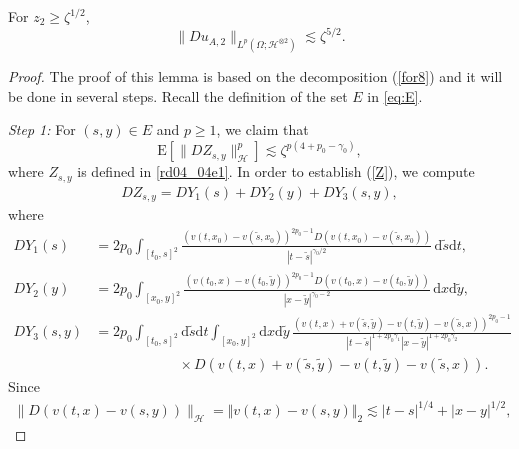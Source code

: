 \documentclass[12pt,a4paper]{article}
\newcommand{\E}{\mathrm{E}}
\renewcommand{\d}{\mathrm{d}}
\newcommand {\deltah}{{\zeta}}
\newcommand{\<}{\langle}
\renewcommand{\>}{\rangle}
\begin{document}
 
 
 \begin{lemma}\label{lem:DuA2}
 For $z_2\geq \deltah^{1/2}$,  
 \begin{equation} \label{UA}
 \|Du_{A,2}\|_{L^p(\Omega;\mathcal{H}^{\otimes2})} \lesssim \deltah^{5/2}.
 \end{equation}
 \end{lemma}
 
 \begin{proof} The proof of this lemma is based on the decomposition (\ref{for8}) and it will be done in several steps. Recall the definition of the set $E$ in \eqref{eq:E}.
 
 \medskip
 \noindent
 {\it Step 1:}
            For $(s,y)\in E$ and $p\geq1$,  we claim that
            \begin{equation} \label{Z}
             \E\left[\|DZ_{s,y}\|_{\mathcal{H}}^p \right] \lesssim \deltah^{p(4+p_0-\gamma_0)},
           \end{equation}
 where $Z_{s,y}$ is defined in \eqref{rd04_04e1}.  In order to establish (\ref{Z}), we compute 
           \begin{align}\label{eq:sum123}
           DZ_{s,y} = DY_1(s) + DY_2(y) + DY_3(s,y),
           \end{align}
           where
\begin{align*}
           DY_1(s) &= 2p_0\int_{[t_0, s]^2} \frac{(v(t,x_0)-v(\tilde{s},x_0))^{2p_0-1} D(v(t,x_0)-v(\tilde{s},x_0))}{|t-\tilde{s}|^{\gamma_0/2}}  \, \d \tilde{s} \d t,\\[6pt]
           DY_2(y)&=2p_0\int_{[x_0, y]^2} \frac {(v(t_0,x)-v(t_0,\tilde{y}))^{2p_0-1}  D\left(
           v(t_0,x)-v(t_0,\tilde{y})
           \right)}{|x-\tilde{y}|^{\gamma_0-2} }\, \d x\d \tilde{y},\\[6pt]
            DY_3(s,y)&=2p_0\int_{[t_0, s]^2}\d \tilde{s}\d t \int_{[x_0, y]^2} \d x\d \tilde{y} \, 
             \frac {(v(t,x)+v(\tilde{s},\tilde{y})-v(t,\tilde{y})-v(\tilde{s},x))^{2p_0-1}
            }{|t-\tilde{s}|^{1+2p_0\gamma_1}|x-\tilde{y}|^{1+2p_0\gamma_2}}\\
                       &  \qquad\qquad\qquad \times D\left(v(t,x)+v(\tilde{s},\tilde{y})-v(t,\tilde{y})-v(\tilde{s},x)\right).
\end{align*}
Since
\begin{align}
           \|D\left(v(t,x)-v(s,y)\right)\|_{\mathcal{H}} =
                      \Vert v(t, x) - v(s, y) \Vert_{2}  \lesssim |t-s|^{1/4}+|x-y|^{1/2},
\label{eq:increment2}           
\end{align}

\end{proof}
\end{document}
